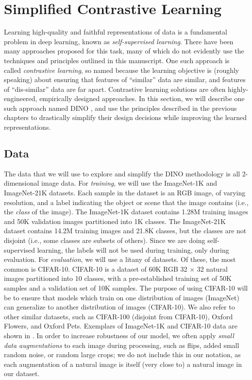 \documentclass[../../book-main.tex]{subfiles}
\begin{document}
\section{Simplified Contrastive Learning}\label{sec:contrastive_learning}

Learning high-quality and faithful representations of data is a fundamental problem in deep learning, known as \textit{self-supervised learning}. There have been many approaches proposed for this task, many of which do not evidently use the techniques and principles outlined in this manuscript. One such approach is called \textit{contrastive learning}, so named because the learning objective is (roughly speaking) about ensuring that features of ``similar'' data are similar, and features of ``dis-similar'' data are far apart. Contrastive learning solutions are often highly-engineered, empirically designed approaches. In this section, we will describe one such approach named DINO \citep{caron2021emerging}, and use the principles described in the previous chapters to drastically simplify their design decisions while improving the learned representations.

\subsection{Data}\label{sub:contrastive_learning_data}

The data that we will use to explore and simplify the DINO methodology is all 2-dimensional image data. For \textit{training}, we will use the ImageNet-1K and ImageNet-21K datasets. Each sample in the dataset is an RGB image, of varying resolution, and a label indicating the object or scene that the image contains (i.e., the \textit{class} of the image). The ImageNet-1K dataset contains 1.28M training images and 50K validation images partitioned into 1K classes. The ImageNet-21K dataset contains 14.2M training images and 21.8K classes, but the classes are not disjoint (i.e., some classes are subsets of others). Since we are doing self-supervised learning, the labels will not be used during training, only during evaluation. For \textit{evaluation}, we will use a litany of datasets. Of these, the most common is CIFAR-10. CIFAR-10 is a dataset of 60K RGB 32 \(\times\) 32 natural images partitioned into 10 classes, with a pre-established training set of 50K samples and a validation set of 10K samples. The purpose of using CIFAR-10 will be to ensure that models which train on one distribution of images (ImageNet) can generalize to another distribution of images (CIFAR-10). We also refer to other similar datasets, such as CIFAR-100 (disjoint from CIFAR-10), Oxford Flowers, and Oxford Pets. Exemplars of ImageNet-1K and CIFAR-10 data are shown in . In order to increase robustness of our model, we often apply \textit{small data augmentations} to each image during processing, such as flips, added small random noise, or random large crops; we do not include this in our notation, as each augmentation of a natural image is itself (very close to) a natural image in our dataset.
\end{document}
